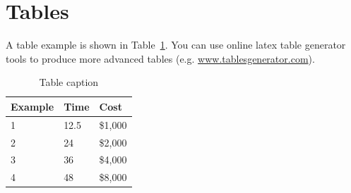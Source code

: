 \section{Tables}

A table example is shown in Table~\ref{tab:exampleTable}. You can use online latex table generator tools to produce more advanced tables (e.g. \href{https://www.tablesgenerator.com/}{www.tablesgenerator.com}).


\begin{table}[t]
	\caption{Table caption}
	\label{tab:exampleTable}
    \centering
	\begin{tabular}{l l l}
		\hline
		Example & Time & Cost \\
		\hline
		1 & 12.5 & \$1,000 \\
		2 & 24 & \$2,000 \\
		3 & 36 & \$4,000 \\
		4 & 48 & \$8,000 \\
		\hline
	\end{tabular}
\end{table}